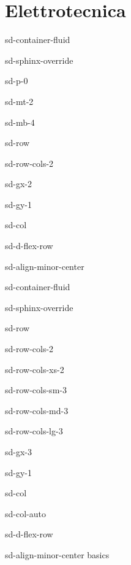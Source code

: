 \documentclass[letterpaper,10pt,italian]{jupyterBook}
\begin{document}
\part{Elettrotecnica}

\sphinxstepscope

\begin{sphinxuseclass}{sd-container-fluid}
\begin{sphinxuseclass}{sd-sphinx-override}
\begin{sphinxuseclass}{sd-p-0}
\begin{sphinxuseclass}{sd-mt-2}
\begin{sphinxuseclass}{sd-mb-4}
\begin{sphinxuseclass}{sd-row}
\begin{sphinxuseclass}{sd-row-cols-2}
\begin{sphinxuseclass}{sd-gx-2}
\begin{sphinxuseclass}{sd-gy-1}
\begin{sphinxuseclass}{sd-col}
\begin{sphinxuseclass}{sd-d-flex-row}
\begin{sphinxuseclass}{sd-align-minor-center}
\begin{sphinxuseclass}{sd-container-fluid}
\begin{sphinxuseclass}{sd-sphinx-override}
\begin{sphinxuseclass}{sd-row}
\begin{sphinxuseclass}{sd-row-cols-2}
\begin{sphinxuseclass}{sd-row-cols-xs-2}
\begin{sphinxuseclass}{sd-row-cols-sm-3}
\begin{sphinxuseclass}{sd-row-cols-md-3}
\begin{sphinxuseclass}{sd-row-cols-lg-3}
\begin{sphinxuseclass}{sd-gx-3}
\begin{sphinxuseclass}{sd-gy-1}
\begin{sphinxuseclass}{sd-col}
\begin{sphinxuseclass}{sd-col-auto}
\begin{sphinxuseclass}{sd-d-flex-row}
\begin{sphinxuseclass}{sd-align-minor-center}
\sphinxAtStartPar
basics


\end{sphinxuseclass}
\end{sphinxuseclass}
\end{sphinxuseclass}
\end{sphinxuseclass}
\end{sphinxuseclass}
\end{sphinxuseclass}
\end{sphinxuseclass}
\end{sphinxuseclass}
\end{sphinxuseclass}
\end{sphinxuseclass}
\end{sphinxuseclass}
\end{sphinxuseclass}
\end{sphinxuseclass}
\end{sphinxuseclass}
\end{sphinxuseclass}
\end{sphinxuseclass}
\end{sphinxuseclass}
\end{sphinxuseclass}
\end{sphinxuseclass}
\end{sphinxuseclass}
\end{sphinxuseclass}
\end{sphinxuseclass}
\end{sphinxuseclass}
\end{sphinxuseclass}
\end{sphinxuseclass}
\end{sphinxuseclass}
\end{document}
